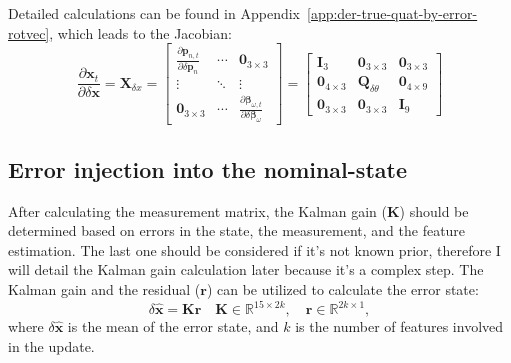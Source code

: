 Detailed calculations can be found in Appendix~\ref{app:der-true-quat-by-error-rotvec}, which leads to the Jacobian:
\begin{equation}
    \frac{\partial\mathbf{x}_t}{\partial\delta\mathbf{x}} = \mathbf{X}_{\delta x}=\begin{bmatrix}
        \frac{\partial\mathbf{p}_{n,t}}{\partial\delta\mathbf{p}_n} & \cdots & \mathbf{0}_{3\times 3} \\ \vdots & \ddots & \vdots \\
        \mathbf{0}_{3\times 3} & \cdots & \frac{\partial\boldsymbol{\beta}_{\omega, t}}{\partial\delta\boldsymbol{\beta}_{\omega}}
    \end{bmatrix} = \begin{bmatrix}
        \mathbf{I}_3 & \mathbf{0}_{3\times 3} & \mathbf{0}_{3\times 3} \\
        \mathbf{0}_{4\times 3} & \mathbf{Q}_{\delta\theta} & \mathbf{0}_{4\times 9} \\
        \mathbf{0}_{3\times 3} & \mathbf{0}_{3\times 3} & \mathbf{I}_{9}
    \end{bmatrix}
\end{equation}

\subsection{Error injection into the nominal-state}

After calculating the measurement matrix, the Kalman gain ($\mathbf{K}$) should be determined based on errors in the state, the measurement, and the feature estimation. The last one should be considered if it's not known prior, therefore I will detail the Kalman gain calculation later because it's a complex step. The Kalman gain and the residual ($\mathbf{r}$) can be utilized to calculate the error state:
\begin{equation}
    \delta\hat{\mathbf{x}} = \mathbf{K}\mathbf{r} \quad \mathbf{K}\in\mathbb{R}^{15\times 2k},\quad\mathbf{r}\in\mathbb{R}^{2k\times 1},
\end{equation}
where $\delta\hat{\mathbf{x}}$ is the mean of the error state, and $k$ is the number of features involved in the update.

